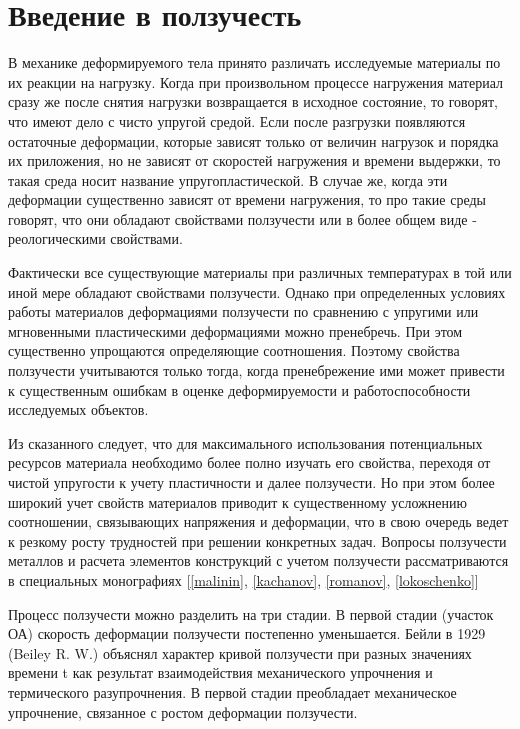\section{Введение в ползучесть}
В механике деформируемого тела принято различать исследуемые материалы по их 
реакции на нагрузку. Когда при произвольном процессе нагружения материал сразу же после
снятия нагрузки возвращается в исходное состояние, то говорят, что имеют дело с чисто 
упругой средой. Если после разгрузки появляются остаточные деформации, которые зависят
только от величин нагрузок и порядка их приложения, но не зависят от
скоростей нагружения и времени выдержки, то такая среда носит название 
упругопластической.
В случае же, когда эти деформации существенно зависят от времени нагружения, то про такие 
среды говорят, что они обладают свойствами ползучести или в более общем виде - реологическими
свойствами.

Фактически все существующие материалы при различных температурах в той или иной мере 
обладают свойствами ползучести. Однако при определенных условиях работы материалов 
деформациями ползучести по сравнению с упругими или мгновенными пластическими 
деформациями можно пренебречь. При этом существенно упрощаются определяющие соотношения. 
Поэтому свойства ползучести учитываются только тогда, когда пренебрежение ими может 
привести к существенным ошибкам в оценке деформируемости и работоспособности исследуемых 
объектов.

Из сказанного следует, что для максимального использования потенциальных ресурсов 
материала необходимо более полно изучать его свойства, переходя от чистой упругости к 
учету пластичности и далее ползучести. Но при этом более широкий учет свойств материалов 
приводит к существенному усложнению соотношении, связывающих напряжения и деформации, что 
в свою очередь ведет к резкому росту трудностей при решении конкретных задач.
Вопросы ползучести металлов и расчета элементов конструкций с учетом ползучести 
рассматриваются в специальных монографиях [\ref{malinin}, \ref{kachanov}, \ref{romanov}, \ref{lokoschenko}]

Процесс ползучести можно разделить на три стадии. В первой стадии (участок 	
ОА) скорость деформации ползучести постепенно уменьшается. Бейли в 1929 
(Beiley R. W.) объяснял характер кривой ползучести при разных значениях 
времени t как результат взаимодействия механического упрочнения и 
термического разупрочнения. В первой стадии преобладает механическое 
упрочнение, связанное с ростом деформации ползучести.


